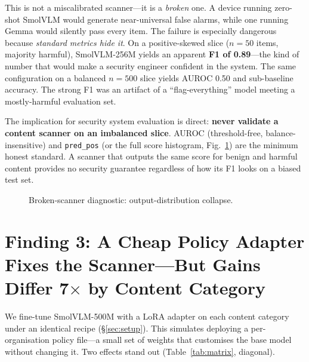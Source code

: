 \documentclass[sigconf,nonacm]{acmart}
\begin{document}
This is not a miscalibrated scanner---it is a \emph{broken} one. A device running
zero-shot SmolVLM would generate near-universal false alarms, while one running Gemma would
silently pass every item. The failure is especially dangerous because \emph{standard metrics
hide it}. On a positive-skewed slice ($n{=}50$ items, majority harmful), SmolVLM-256M
yields an apparent \textbf{F1 of 0.89}---the kind of number that would make a security
engineer confident in the system. The same configuration on a balanced $n{=}500$ slice
yields AUROC 0.50 and sub-baseline accuracy. The strong F1 was an artifact of a
``flag-everything'' model meeting a mostly-harmful evaluation set.

The implication for security system evaluation is direct: \textbf{never validate a
content scanner on an imbalanced slice}. AUROC (threshold-free, balance-insensitive) and
\texttt{pred\_pos} (or the full score histogram, Fig.~\ref{fig:hist}) are the minimum
honest standard. A scanner that outputs the same score for benign and harmful content
provides no security guarantee regardless of how its F1 looks on a biased test set.

\begin{figure}[t]
\centering
{}
\caption{Broken-scanner diagnostic: output-distribution collapse.}
\label{fig:hist}
\end{figure}

\section{Finding 3: A Cheap Policy Adapter Fixes the Scanner---But Gains Differ 7$\times$
by Content Category}\label{sec:adapt}
We fine-tune SmolVLM-500M with a LoRA adapter on each content category under an identical
recipe (\S\ref{sec:setup}). This simulates deploying a per-organisation policy file---a
small set of weights that customises the base model without changing it. Two effects stand
out (Table~\ref{tab:matrix}, diagonal).
\end{document}
